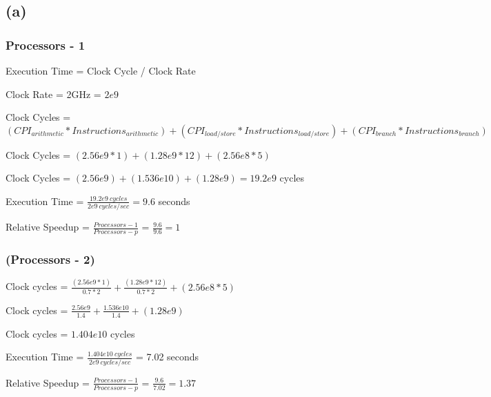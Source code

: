 \documentclass{article}
\begin{document}
    \subsection*{(a)}

    \subsubsection*{Processors - 1}

    Execution Time = Clock Cycle / Clock Rate

    Clock Rate = 2GHz = $2e9$

    \vspace*{6pt}

    Clock Cycles = $(CPI_{arithmetic} * Instructions_{arithmetic}) + (CPI_{load/store} * Instructions_{load/store}) + (CPI_{branch} * Instructions_{branch}) $

    \vspace*{6pt}

    Clock Cycles = $(2.56e9 * 1) + (1.28e9 * 12) + (2.56e8 * 5)$

    Clock Cycles = $(2.56e9) + (1.536e{10}) + (1.28e9) = 19.2e9$ cycles

    Execution Time = $\frac{19.2e9\ cycles}{2e9\ cycles/sec} = 9.6$ seconds
    
    \vspace*{6pt}

    Relative Speedup = $\frac{Processors - 1}{Processors - p}$ = $\frac{9.6}{9.6} = 1$

    \subsubsection*{(Processors - 2)}

    Clock cycles = $\frac{(2.56e9 * 1)}{0.7 * 2} + \frac{(1.28e9 * 12)}{0.7*2} + (2.56e8 * 5)$

    \vspace*{6pt}

    Clock cycles = $\frac{2.56e9}{1.4} + \frac{1.536e{10}}{1.4} + (1.28e9) $
    
    \vspace*{6pt}

    Clock cycles = $1.404e10$ cycles
    \vspace*{6pt}
    
    Execution Time = $\frac{1.404e10\ cycles}{2e9\ cycles/sec}$ = 7.02 seconds
    \vspace*{6pt}

    Relative Speedup = $\frac{Processors - 1}{Processors - p}$ = $\frac{9.6}{7.02} = 1.37 $
\end{document}
